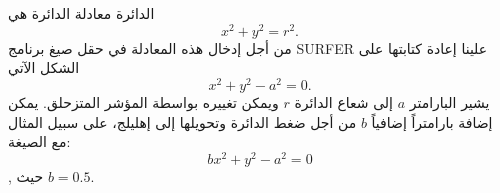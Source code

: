 \begin{surferPage}[Circle]{الدائرة}
معادلة الدائرة هي
\[x^2+y^2=r^2.\]
من أجل إدخال هذه المعادلة في حقل صيغ برنامج \textenglish{SURFER} علينا إعادة كتابتها على الشكل الآتي
\[x^2+y^2-a^2=0.\]
يشير البارامتر $a$ إلى شعاع الدائرة $r$ ويمكن تغييره بواسطة المؤشر المتزحلق. يمكن إضافة بارامتراً إضافياً $ b $ من أجل ضغط الدائرة وتحويلها إلى إهليلج، على سبيل المثال مع الصيغة:
\[bx^2+y^2-a^2=0\], حيث $b=0.5$.
\end{surferPage}
